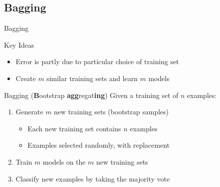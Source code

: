 \documentclass[14pt]{beamer}
\begin{document}
\subsection{Bagging}
\begin{frame}[<+->]{Bagging}
	\begin{block}{Key Ideas}
		\begin{itemize}
			\item Error is partly due to particular choice of training set
			\item Create $m$ similar training sets and learn $m$ models
		\end{itemize}
	\end{block}
	\begin{block}{Bagging (\textbf{B}ootstrap \textbf{agg}regat\textbf{ing})}
		Given a training set of $n$ examples:
		\begin{enumerate}
			\item Generate $m$ new training sets (\alert{bootstrap samples})
				\begin{itemize}
					\item Each new training set contains $n$ examples
					\item Examples selected randomly, with replacement
				\end{itemize}
			\item Train $m$ models on the $m$ new training sets
			\item Classify new examples by taking the majority vote
		\end{enumerate}
	\end{block}
\end{frame}
\end{document}
